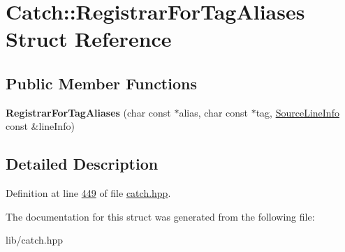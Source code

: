 \hypertarget{structCatch_1_1RegistrarForTagAliases}{}\section{Catch\+::Registrar\+For\+Tag\+Aliases Struct Reference}
\label{structCatch_1_1RegistrarForTagAliases}
\subsection*{Public Member Functions}
\begin{DoxyCompactItemize}
\item 
\mbox{\label{structCatch_1_1RegistrarForTagAliases_ae4e45830e4763bcd65d55d8db9167b69}} 
{\bfseries Registrar\+For\+Tag\+Aliases} (char const $\ast$alias, char const $\ast$tag, \mbox{\hyperlink{structCatch_1_1SourceLineInfo}{Source\+Line\+Info}} const \&line\+Info)
\end{DoxyCompactItemize}


\subsection{Detailed Description}


Definition at line \mbox{\hyperlink{catch_8hpp_source_l00449}{449}} of file \mbox{\hyperlink{catch_8hpp_source}{catch.\+hpp}}.



The documentation for this struct was generated from the following file\+:\begin{DoxyCompactItemize}
\item 
lib/catch.\+hpp\end{DoxyCompactItemize}
